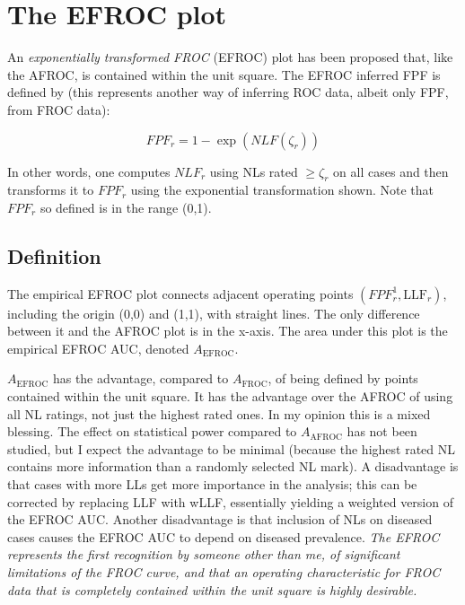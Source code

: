 \documentclass[
]{book}
\begin{document}
\hypertarget{froc-empirical-EFROC}{%
\section{The EFROC plot}\label{froc-empirical-EFROC}}

An \emph{exponentially transformed FROC} (EFROC) plot has been proposed \citep{RN2366} that, like the AFROC, is contained within the unit square. The EFROC inferred FPF is defined by (this represents another way of inferring ROC data, albeit only FPF, from FROC data):

\begin{equation}
FPF_r= 1 - \exp\left ( NLF\left ( \zeta_r \right ) \right )
\label{eq:froc-empirical-EFROC}
\end{equation}

In other words, one computes \(NLF_r\) using NLs rated \(\geq \zeta_r\) on all cases and then transforms it to \(FPF_r\) using the exponential transformation shown. Note that \(FPF_r\) so defined is in the range (0,1).

\hypertarget{froc-empirical-definition-auc-EFROC}{%
\subsection{Definition}\label{froc-empirical-definition-auc-EFROC}}

The empirical EFROC plot connects adjacent operating points \(\left ( FPF_r^1, \text{LLF}_r \right )\), including the origin (0,0) and (1,1), with straight lines. The only difference between it and the AFROC plot is in the x-axis. The area under this plot is the empirical EFROC AUC, denoted \(A_{\text{EFROC}}\).

\(A_{\text{EFROC}}\) has the advantage, compared to \(A_{\text{FROC}}\), of being defined by points contained within the unit square. It has the advantage over the AFROC of using all NL ratings, not just the highest rated ones. In my opinion this is a mixed blessing. The effect on statistical power compared to \(A_{\text{AFROC}}\) has not been studied, but I expect the advantage to be minimal (because the highest rated NL contains more information than a randomly selected NL mark). A disadvantage is that cases with more LLs get more importance in the analysis; this can be corrected by replacing LLF with wLLF, essentially yielding a weighted version of the EFROC AUC. Another disadvantage is that inclusion of NLs on diseased cases causes the EFROC AUC to depend on diseased prevalence. \emph{The EFROC represents the first recognition by someone other than me, of significant limitations of the FROC curve, and that an operating characteristic for FROC data that is completely contained within the unit square is highly desirable.}
\end{document}
